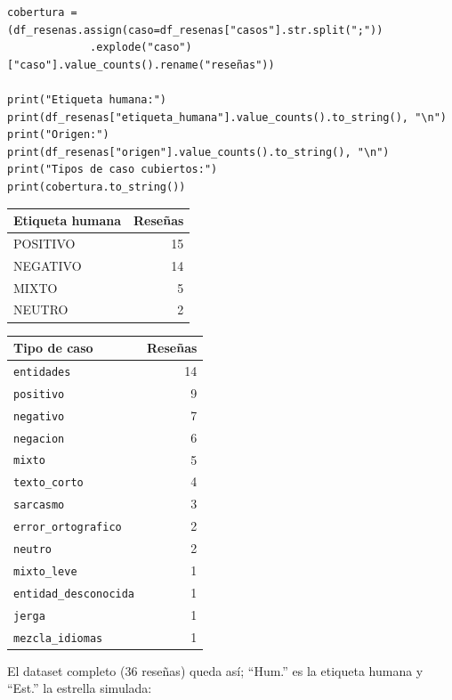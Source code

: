 \documentclass[12pt,a4paper]{article}
\begin{document}
\begin{lstlisting}[style=codigo]
cobertura = (df_resenas.assign(caso=df_resenas["casos"].str.split(";"))
             .explode("caso")["caso"].value_counts().rename("reseñas"))

print("Etiqueta humana:")
print(df_resenas["etiqueta_humana"].value_counts().to_string(), "\n")
print("Origen:")
print(df_resenas["origen"].value_counts().to_string(), "\n")
print("Tipos de caso cubiertos:")
print(cobertura.to_string())
\end{lstlisting}

\begin{center}\small\renewcommand{\arraystretch}{1.25}
\begin{tabular}[t]{|l|r|}\hline\textbf{Etiqueta humana} & \textbf{Reseñas} \\ \hline
POSITIVO & 15 \\ \hline
NEGATIVO & 14 \\ \hline
MIXTO & 5 \\ \hline
NEUTRO & 2 \\ \hline
\end{tabular}\qquad
\begin{tabular}[t]{|l|r|}\hline\textbf{Tipo de caso} & \textbf{Reseñas} \\ \hline
\texttt{entidades} & 14 \\ \hline
\texttt{positivo} & 9 \\ \hline
\texttt{negativo} & 7 \\ \hline
\texttt{negacion} & 6 \\ \hline
\texttt{mixto} & 5 \\ \hline
\texttt{texto\_corto} & 4 \\ \hline
\texttt{sarcasmo} & 3 \\ \hline
\texttt{error\_ortografico} & 2 \\ \hline
\texttt{neutro} & 2 \\ \hline
\texttt{mixto\_leve} & 1 \\ \hline
\texttt{entidad\_desconocida} & 1 \\ \hline
\texttt{jerga} & 1 \\ \hline
\texttt{mezcla\_idiomas} & 1 \\ \hline
\end{tabular}\end{center}


El dataset completo (36 reseñas) queda así; ``Hum.'' es la etiqueta humana y ``Est.'' la
estrella simulada:
\end{document}
